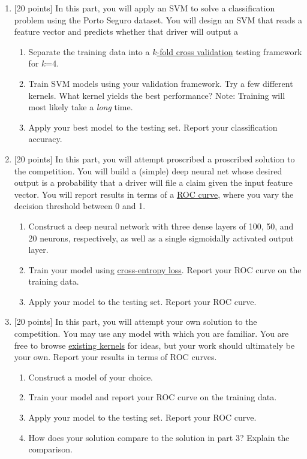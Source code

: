 \documentclass[12pt]{article}
\newenvironment{problem}[2][Problem:]{\begin{trivlist}
\item[\hskip \labelsep {\bfseries #1}\hskip \labelsep {\bfseries #2.}]}{\end{trivlist}}
\begin{document}
\begin{problem}{Porto Seguro Dataset [70 points]}
\begin{enumerate}
    \item {[20 points]} 
    In this part, you will apply an SVM to solve a classification problem using the Porto Seguro dataset.
    You will design an SVM that reads a feature vector and predicts whether that driver will output a 
    \begin{enumerate}
    	\item Separate the training data into a \href{https://en.wikipedia.org/wiki/Cross-validation_(statistics)#k-fold_cross-validation}{$k$-fold cross validation} testing framework for $k$=4. 
    	\item Train SVM models using your validation framework. Try a few different kernels. What kernel yields the best performance? Note: Training will most likely take a \emph{long} time. 
	\item Apply your best model to the testing set. Report your classification accuracy. 
    \end{enumerate}

    \item {[20 points]} 
    In this part, you will attempt proscribed a proscribed solution to the competition. 
    You will build a (simple) deep neural net whose desired output is a probability that a driver will file a claim given the input feature vector. 
    You will report results in terms of a \href{https://en.wikipedia.org/wiki/Receiver_operating_characteristic}{ROC curve}, where you vary the decision threshold between 0 and 1. 
    \begin{enumerate}
    	\item Construct a deep neural network with three dense layers of 100, 50, and 20 neurons, respectively, as well as a single sigmoidally activated output layer.
	\item Train your model using \href{https://en.wikipedia.org/wiki/Cross_entropy}{cross-entropy loss}. Report your ROC curve on the training data.
	\item Apply your model to the testing set. Report your ROC curve.
    \end{enumerate}

    \item {[20 points]} 
    In this part, you will attempt your own solution to the competition. 
    You may use any model with which you are familiar.
    You are free to browse \href{https://www.kaggle.com/c/porto-seguro-safe-driver-prediction/kernels}{existing kernels} for ideas, but your work should ultimately be your own. 
    Report your results in terms of ROC curves. 
    \begin{enumerate}
    	\item Construct a model of your choice.
	\item Train your model and report your ROC curve on the training data.
	\item Apply your model to the testing set. Report your ROC curve.
	\item How does your solution compare to the solution in part 3? Explain the comparison. 
    \end{enumerate}


\end{enumerate}
\end{problem}
\end{document}

